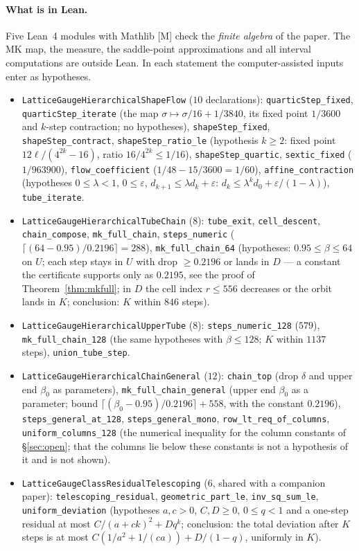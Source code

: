 \documentclass[11pt,a4paper]{article}
\theoremstyle{definition}
\theoremstyle{remark}
\newcommand{\code}[1]{\texttt{#1}}
\begin{document}
{\sloppy
\paragraph{What is in Lean.}
Five Lean~4 modules with Mathlib [M] check the \emph{finite algebra} of the paper.
The MK map, the measure, the saddle-point approximations and all interval computations are outside Lean.
In each statement the computer-assisted inputs enter as hypotheses.
\begin{itemize}[nosep]
\item \code{LatticeGaugeHierarchicalShapeFlow} ($10$ declarations): \code{quarticStep\_fixed}, \code{quarticStep\_iterate} (the map $\sigma\mapsto\sigma/16+1/3840$, its fixed point $1/3600$ and $k$-step contraction; no hypotheses), \code{shapeStep\_fixed}, \code{shapeStep\_contract}, \code{shapeStep\_ratio\_le} (hypothesis $k\ge2$: fixed point $12\ell/(4^{2k}-16)$, ratio $16/4^{2k}\le1/16$), \code{shapeStep\_quartic}, \code{sextic\_fixed} ($1/963900$), \code{flow\_coefficient} ($1/48-15/3600=1/60$), \code{affine\_contraction} (hypotheses $0\le\lambda<1$, $0\le\varepsilon$, $d_{k+1}\le\lambda d_k+\varepsilon$: $d_k\le\lambda^kd_0+\varepsilon/(1-\lambda)$), \code{tube\_iterate}.
\item \code{LatticeGaugeHierarchicalTubeChain} ($8$): \code{tube\_exit}, \code{cell\_descent}, \code{chain\_compose}, \code{mk\_full\_chain}, \code{steps\_numeric} ($\lceil(64-0.95)/0.2196\rceil=288$), \code{mk\_full\_chain\_64} (hypotheses: $0.95\le\beta\le64$ on $U$; each step stays in $U$ with drop $\ge0.2196$ or lands in $D$ --- a constant the certificate supports only as $0.2195$, see the proof of Theorem~\ref{thm:mkfull}; in $D$ the cell index $r\le556$ decreases or the orbit lands in $K$; conclusion: $K$ within $846$ steps).
\item \code{LatticeGaugeHierarchicalUpperTube} ($8$): \code{steps\_numeric\_128} ($579$), \code{mk\_full\_chain\_128} (the same hypotheses with $\beta\le128$; $K$ within $1137$ steps), \code{union\_tube\_step}.
\item \code{LatticeGaugeHierarchicalChainGeneral} ($12$): \code{chain\_top} (drop $\delta$ and upper end $\beta_0$ as parameters), \code{mk\_full\_chain\_general} (upper end $\beta_0$ as a parameter; bound $\lceil(\beta_0-0.95)/0.2196\rceil+558$, with the constant $0.2196$), \code{steps\_general\_at\_128}, \code{steps\_general\_mono}, \code{row\_lt\_req\_of\_columns}, \code{uniform\_columns\_128} (the numerical inequality for the column constants of \S\ref{sec:open}; that the columns lie below these constants is not a hypothesis of it and is not shown).
\item \code{LatticeGaugeClassResidualTelescoping} ($6$, shared with a companion paper): \code{telescoping\_residual}, \code{geometric\_part\_le}, \code{inv\_sq\_sum\_le}, \code{uniform\_deviation} (hypotheses $a,c>0$, $C,D\ge0$, $0\le q<1$ and a one-step residual at most $C/(a+ck)^2+Dq^k$; conclusion: the total deviation after $K$ steps is at most $C(1/a^2+1/(ca))+D/(1-q)$, uniformly in $K$).
\end{itemize}

\par}
\end{document}
